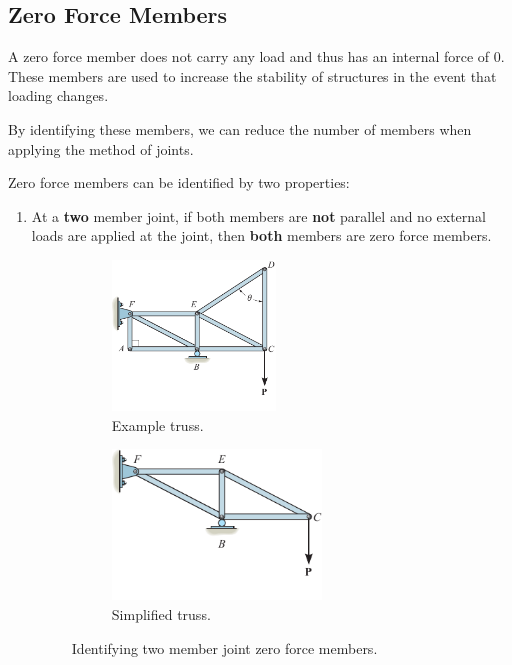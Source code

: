 \documentclass{article}
\begin{document}
\subsection{Zero Force Members}
A zero force member does not carry any load and thus has an internal force of 0.
These members are used to increase the stability of structures in the event that loading changes.

By identifying these members, we can reduce the number of members when applying the method of joints.

Zero force members can be identified by two properties:
\begin{enumerate}
    \item At a \textbf{two} member joint, if both members are \textbf{not} parallel and no external loads are
          applied at the joint, then \textbf{both} members are zero force members.
          \begin{figure}[H]
              \centering
              \begin{subfigure}{0.48\linewidth}
                  \centering
                  \includegraphics[height = 4cm, keepaspectratio = true]{figures/zero_force_two_member.pdf}
                  \caption{Example truss.}
              \end{subfigure}
              \begin{subfigure}{0.48\linewidth}
                  \centering
                  \includegraphics[height = 4cm, keepaspectratio = true]{figures/zero_force_two_member_simplified.pdf}
                  \caption{Simplified truss.}
              \end{subfigure}
              \caption{Identifying two member joint zero force members.} %

\end{figure}
\end{enumerate}
\end{document}
